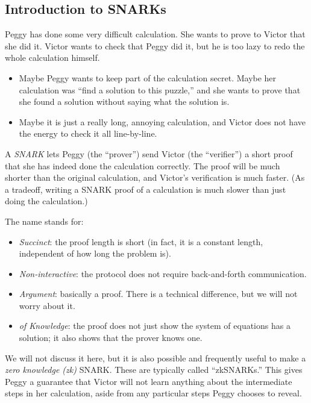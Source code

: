 
\subsection{Introduction to SNARKs}

Peggy has done some very difficult calculation. She wants to prove to
Victor that she did it. Victor wants to check that Peggy did it, but he
is too lazy to redo the whole calculation himself.

\begin{itemize}
\item
  Maybe Peggy wants to keep part of the calculation secret. Maybe her
  calculation was ``find a solution to this puzzle,'' and she wants to
  prove that she found a solution without saying what the solution is.
\item
  Maybe it is just a really long, annoying calculation, and Victor does
  not have the energy to check it all line-by-line.
\end{itemize}

A \emph{SNARK} lets Peggy (the ``prover'') send Victor (the
``verifier'') a short proof that she has indeed done the calculation
correctly. The proof will be much shorter than the original calculation,
and Victor's verification is much faster. (As a tradeoff, writing a
SNARK proof of a calculation is much slower than just doing the
calculation.)

The name stands for:
\begin{itemize}
\item
  \emph{Succinct}: the proof length is short (in fact, it is a constant
  length, independent of how long the problem is).
\item
  \emph{Non-interactive}: the protocol does not require back-and-forth
  communication.
\item
  \emph{Argument}: basically a proof. There is a technical difference,
  but we will not worry about it.
\item
  \emph{of Knowledge}: the proof does not just show the system of
  equations has a solution; it also shows that the prover knows one.
\end{itemize}

We will not discuss it here, but it is also possible and frequently
useful to make a \emph{zero knowledge (zk)} SNARK. These are typically
called ``zkSNARKs.'' This gives Peggy a guarantee that Victor will not
learn anything about the intermediate steps in her calculation, aside
from any particular steps Peggy chooses to reveal.

